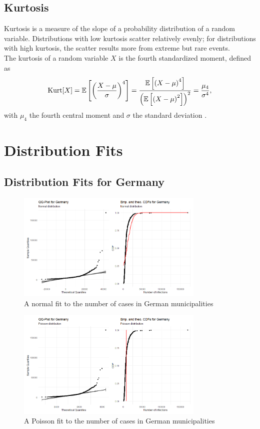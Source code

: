 \subsection{Kurtosis}
Kurtosis is a measure of the slope of a probability distribution of a random variable. Distributions with low kurtosis scatter relatively evenly; for distributions with high kurtosis, the scatter results more from extreme but rare events. \\
The kurtosis of a random variable $X$ is the fourth standardized moment, defined as
\begin{equation}\label{eq:kurtosis}
    \hbox{Kurt}[X]=\mathbb{E}\left[\left(\frac{X-\mu}{\sigma}\right)^4\right] = \frac{\mathbb{E}\left[\left(X-\mu\right)^4\right]}{\left(\mathbb{E}\left[\left(X-\mu\right)^2\right]\right)^2}=\frac{\mu_4}{\sigma^4},
\end{equation}
with $\mu_4$ the fourth central moment and $\sigma$ the standard deviation \autocite[][]{decarlo1997meaning, wilkins1944note}.
\clearpage
\section{Distribution Fits}
\subsection{Distribution Fits for Germany}
\begin{figure}[H]
    \centering
    \includegraphics[width = 0.8\textwidth]{fit_normal_germany.png}
    \caption{A normal fit to the number of cases in German municipalities}
    \label{fitNormalGermany}
\end{figure}
\begin{figure}[H]
    \centering
    \includegraphics[width = 0.8\textwidth]{fit_poisson_germany.png}
    \caption{A Poisson fit to the number of cases in German municipalities}
    \label{fitPoissonGermany}
\end{figure}
